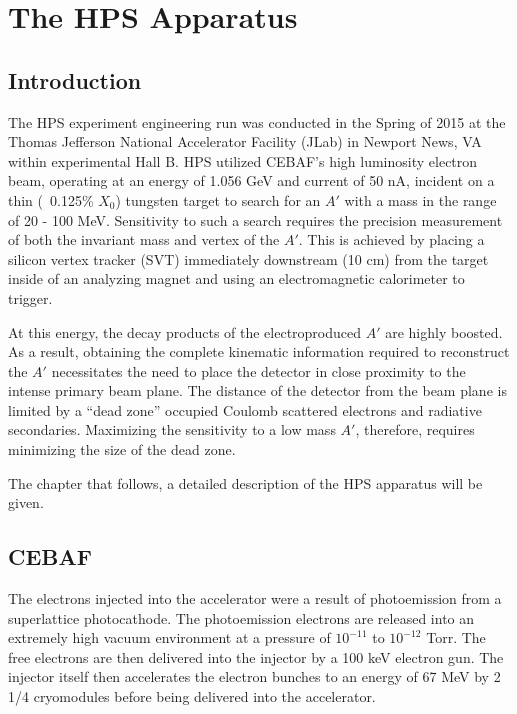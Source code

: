 
\chapter{The HPS Apparatus}

\section{Introduction}

The HPS experiment engineering run was conducted in the Spring of 2015 at the 
Thomas Jefferson National Accelerator Facility (JLab) in Newport News, VA 
within experimental Hall B.  HPS utilized CEBAF's high luminosity electron beam,
operating at an energy of 1.056 GeV and current of 50 nA, incident on a thin
(~0.125\% $X_{0}$) tungsten target to search for an $A'$ with a mass in the 
range of 20 - 100 MeV.  Sensitivity to such a search requires the precision 
measurement of both the invariant mass and vertex of the $A'$.  This is 
achieved by placing a silicon vertex tracker (SVT) immediately downstream 
(10 cm) from the target inside of an analyzing magnet and using an 
electromagnetic calorimeter to trigger.

At this energy, the decay products of the electroproduced $A'$ are highly 
boosted. As a result, obtaining the complete kinematic information required
to reconstruct the $A'$ necessitates 
the need to place the detector in close proximity to the intense primary beam
plane.  The distance of the detector from the beam plane is limited by a 
``dead zone'' occupied Coulomb scattered electrons and radiative secondaries. 
Maximizing the sensitivity to a low mass $A'$, therefore, requires minimizing
the size of the dead zone.

The chapter that follows, a detailed description of the HPS apparatus will
be given.

\section{CEBAF}

The electrons injected into the accelerator were a result of photoemission from
a superlattice photocathode.  The photoemission electrons are released into an
extremely high vacuum environment at a pressure of $10^{-11}$ to $10^{-12}$ 
Torr.  The free electrons are then delivered into the injector by a 100 keV 
electron gun.  The injector itself then accelerates the electron bunches to 
an energy of 67 MeV by 2 1/4 cryomodules before being delivered into the 
accelerator.  

